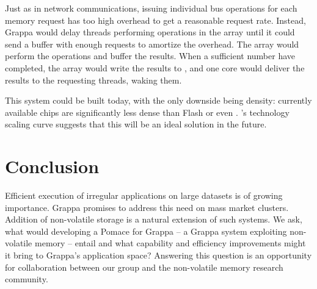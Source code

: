 Just as in network communications, issuing individual  bus
operations for each memory request has too high overhead to get a
reasonable request rate.  Instead, Grappa would delay threads
performing operations in the  array until it could send a buffer
with enough requests to amortize the overhead. The  array would
perform the operations and buffer the results. When a sufficient
number have completed, the  array would write the results to \@,
and one core would deliver the results to the requesting threads,
waking them.


This system could be built today, with the only downside being
density: currently available  chips are significantly less dense
than Flash or even \@. 's technology scaling curve suggests that
this will be an ideal solution in the future.

\section{Conclusion}
Efficient execution of irregular applications on large datasets is of
growing importance.  Grappa promises to address this need on mass
market clusters.  Addition of non-volatile storage is a natural
extension of such systems.  We ask, what would developing a Pomace for
Grappa -- a Grappa system exploiting non-volatile memory -- entail and
what capability and efficiency improvements might it bring to Grappa's
application space?  Answering this question is an opportunity for
collaboration between our group and the non-volatile memory research community.


\begin{spacing}{0.8}


\end{spacing}





